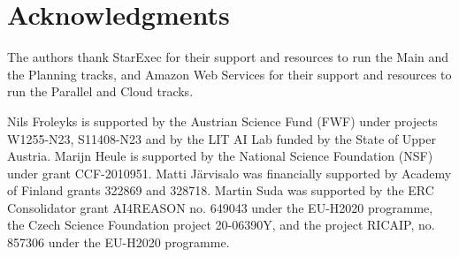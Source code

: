 \documentclass{elsarticle}
\begin{document}
\section*{Acknowledgments}
The authors thank StarExec for their support and resources to run the Main and the Planning tracks, and Amazon Web Services 
for their support and resources to run the Parallel and Cloud tracks. 

Nils Froleyks is supported by the Austrian Science Fund (FWF) under projects
W1255-N23, S11408-N23 and by the LIT AI Lab funded by the State of Upper
Austria.
%
Marijn Heule is supported by the National Science Foundation (NSF) under grant CCF-2010951. 
%
Matti J\"arvisalo was financially supported by Academy of Finland grants 322869 and 328718.
%
Martin Suda was supported by the ERC Consolidator grant AI4REASON no. 649043 under the EU-H2020 programme,
the Czech Science Foundation project 20-06390Y, and the project RICAIP, no. 857306 under the EU-H2020 programme.





\end{document}
